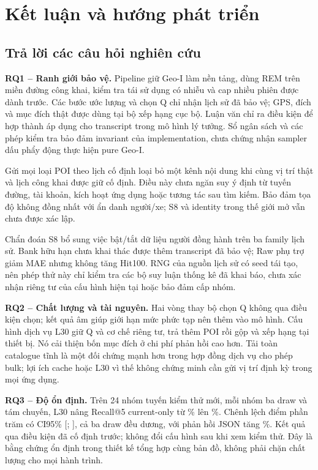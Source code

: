 \chapter{Kết luận và hướng phát triển}
\label{ch:conclusions}

\section{Trả lời các câu hỏi nghiên cứu}

\textbf{RQ1 -- Ranh giới bảo vệ.} Pipeline giữ Geo-I làm nền tảng, dùng REM trên miền đường công khai, kiểm tra tái sử dụng có nhiễu và cap nhiều phiên được dành trước. Các bước ước lượng và chọn Q chỉ nhận lịch sử đã bảo vệ; GPS, đích và mục đích thật được dùng tại bộ xếp hạng cục bộ. Luận văn chỉ ra điều kiện để hợp thành áp dụng cho transcript trong mô hình lý tưởng. Sổ ngân sách và các phép kiểm tra bảo đảm invariant của implementation, chưa chứng nhận sampler dấu phẩy động thực hiện pure Geo-I.

Gửi mọi loại POI theo lịch cố định loại bỏ một kênh nội dung khi cùng vị trí thật và lịch công khai được giữ cố định. Điều này chưa ngăn suy ý định từ tuyến đường, tài khoản, kích hoạt ứng dụng hoặc tương tác sau tìm kiếm. Bảo đảm tọa độ không đồng nhất với ẩn danh người/xe; S8 và identity trong thế giới mở vẫn chưa được xác lập.

Chẩn đoán S8 bổ sung việc bật/tắt dữ liệu người đồng hành trên ba family lịch sử. Bank hữu hạn chưa khai thác được thêm transcript đã bảo vệ; Raw phụ trợ giảm MAE nhưng không tăng Hit100. RNG của nguồn lịch sử có seed tái tạo, nên phép thử này chỉ kiểm tra các bộ suy luận thống kê đã khai báo, chưa xác nhận riêng tư của cấu hình hiện tại hoặc bảo đảm cấp nhóm.

\textbf{RQ2 -- Chất lượng và tài nguyên.} Hai vòng thay bộ chọn Q không qua điều kiện chọn; kết quả âm giúp giới hạn mức phức tạp nên thêm vào mô hình. Cấu hình dịch vụ L30 giữ Q và cơ chế riêng tư, trả thêm POI rồi gộp và xếp hạng tại thiết bị. Nó cải thiện bốn mục đích ở chi phí phản hồi cao hơn. Tải toàn catalogue tĩnh là một đối chứng mạnh hơn trong hợp đồng dịch vụ cho phép bulk; lợi ích cache hoặc L30 vì thế không chứng minh cần gửi vị trí định kỳ trong mọi ứng dụng.

\textbf{RQ3 -- Độ ổn định.} Trên 24 nhóm tuyến kiểm thử mới, mỗi nhóm ba draw và tám chuyến, L30 nâng Recall@5 current-only từ \EvalFreshRecallBefore{}\% lên \EvalFreshRecallAfter{}\%. Chênh lệch \EvalFreshGain{} điểm phần trăm có CI95\% [\EvalFreshLow{}; \EvalFreshHigh{}], cả ba draw đều dương, với phản hồi JSON tăng \EvalReplyGrowth{}\%. Kết quả qua điều kiện đã cố định trước; không đổi cấu hình sau khi xem kiểm thử. Đây là bằng chứng ổn định trong thiết kế tổng hợp cùng bản đồ, không phải chặn chất lượng cho mọi hành trình.

